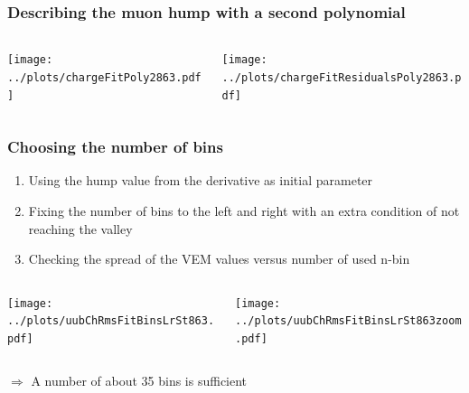 \documentclass[aspectratio=169]{beamer}
\begin{document}
\begin{frame} 
   \frametitle{Describing the muon hump with a second polynomial}
  \begin{columns}
     \begin{column}{0.55\textwidth}
      \texttt{[image: ../plots/chargeFitPoly2863.pdf]}
    \end{column}
    \begin{column}{0.55\textwidth}
      \texttt{[image: ../plots/chargeFitResidualsPoly2863.pdf]}
    \end{column}
  \end{columns}
\end{frame}

\begin{frame} 
  \frametitle{Choosing the number of bins}
  \begin{enumerate}
    \item Using the hump value from the derivative as initial parameter
    \item Fixing the number of bins to the left and right
      with an extra condition of not reaching the valley
    \item Checking the spread of the VEM values versus number
      of used n-bin
  \end{enumerate}
  \begin{center}
    \begin{columns}
      \begin{column}{0.55\textwidth}
        \texttt{[image: ../plots/uubChRmsFitBinsLrSt863.pdf]}
      \end{column}
      \begin{column}{0.55\textwidth}
        \texttt{[image: ../plots/uubChRmsFitBinsLrSt863zoom.pdf]}
      \end{column}
    \end{columns}
  \end{center}
     \hfill $\Rightarrow$ A number of about 35 bins is sufficient 
\end{frame}
\end{document}

